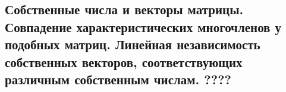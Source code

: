 {
\subsection{
Собственные числа и векторы матрицы. Совпадение характеристических многочленов у подобных матриц. Линейная независимость собственных векторов, соответствующих различным собственным числам. ????
}

}